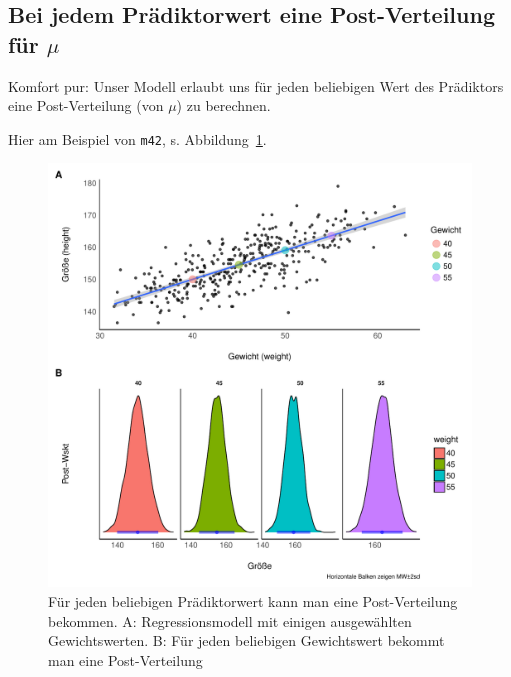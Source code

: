\documentclass[
  a4paper,
  DIV=11]{scrreprt}
\theoremstyle{definition}
\theoremstyle{remark}
\begin{document}
\hypertarget{bei-jedem-pruxe4diktorwert-eine-post-verteilung-fuxfcr-mu}{%
\subsection{\texorpdfstring{Bei jedem Prädiktorwert eine Post-Verteilung
für
\(\mu\)}{Bei jedem Prädiktorwert eine Post-Verteilung für \textbackslash mu}}\label{bei-jedem-pruxe4diktorwert-eine-post-verteilung-fuxfcr-mu}}

Komfort pur: Unser Modell erlaubt uns für jeden beliebigen Wert des
Prädiktors eine Post-Verteilung (von \(\mu\)) zu berechnen.

Hier am Beispiel von \texttt{m42}, s. Abbildung~\ref{fig-post42}.

\begin{figure}

{\centering \includegraphics[width=1\textwidth,height=\textheight]{./lineare-modelle_files/figure-pdf/fig-post42-1.pdf}

}

\caption{\label{fig-post42}Für jeden beliebigen Prädiktorwert kann man
eine Post-Verteilung bekommen. A: Regressionsmodell mit einigen
ausgewählten Gewichtswerten. B: Für jeden beliebigen Gewichtswert
bekommt man eine Post-Verteilung}

\end{figure}
\end{document}
